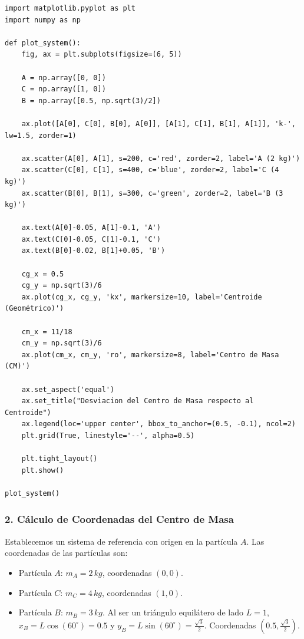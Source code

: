 \documentclass[12pt, a4paper]{article}
\begin{document}
\begin{lstlisting}
import matplotlib.pyplot as plt
import numpy as np

def plot_system():
    fig, ax = plt.subplots(figsize=(6, 5))
    
    A = np.array([0, 0])
    C = np.array([1, 0])
    B = np.array([0.5, np.sqrt(3)/2])
    
    ax.plot([A[0], C[0], B[0], A[0]], [A[1], C[1], B[1], A[1]], 'k-', lw=1.5, zorder=1)
    
    ax.scatter(A[0], A[1], s=200, c='red', zorder=2, label='A (2 kg)')
    ax.scatter(C[0], C[1], s=400, c='blue', zorder=2, label='C (4 kg)')
    ax.scatter(B[0], B[1], s=300, c='green', zorder=2, label='B (3 kg)')
    
    ax.text(A[0]-0.05, A[1]-0.1, 'A')
    ax.text(C[0]-0.05, C[1]-0.1, 'C')
    ax.text(B[0]-0.02, B[1]+0.05, 'B')
    
    cg_x = 0.5
    cg_y = np.sqrt(3)/6
    ax.plot(cg_x, cg_y, 'kx', markersize=10, label='Centroide (Geométrico)')
    
    cm_x = 11/18
    cm_y = np.sqrt(3)/6
    ax.plot(cm_x, cm_y, 'ro', markersize=8, label='Centro de Masa (CM)')
    
    ax.set_aspect('equal')
    ax.set_title("Desviacion del Centro de Masa respecto al Centroide")
    ax.legend(loc='upper center', bbox_to_anchor=(0.5, -0.1), ncol=2)
    plt.grid(True, linestyle='--', alpha=0.5)
    
    plt.tight_layout()
    plt.show()

plot_system()
\end{lstlisting}

\subsubsection*{2. Cálculo de Coordenadas del Centro de Masa}
Establecemos un sistema de referencia con origen en la partícula $A$. Las coordenadas de las partículas son:
\begin{itemize}
    \item Partícula $A$: $m_A = 2 \, \si{kg}$, coordenadas $(0, 0)$.
    \item Partícula $C$: $m_C = 4 \, \si{kg}$, coordenadas $(1, 0)$.
    \item Partícula $B$: $m_B = 3 \, \si{kg}$. Al ser un triángulo equilátero de lado $L=1$, $x_B = L \cos(60^\circ) = 0.5$ y $y_B = L \sin(60^\circ) = \frac{\sqrt{3}}{2}$. Coordenadas $(0.5, \frac{\sqrt{3}}{2})$.
\end{itemize}
\end{document}
